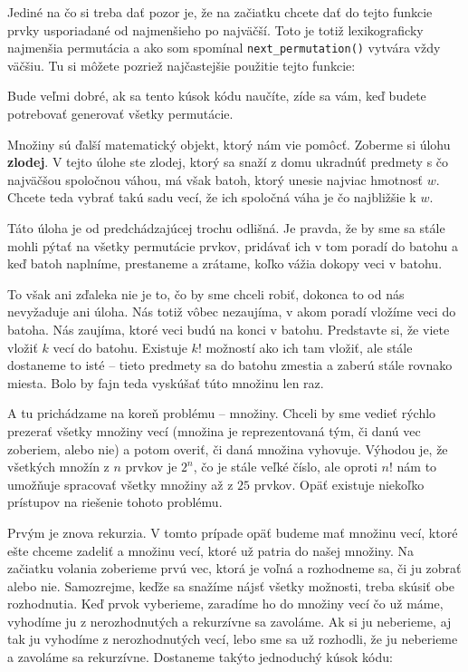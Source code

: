 Jediné na čo si treba dať pozor je, že na začiatku chcete dať do tejto funkcie prvky usporiadané od
najmenšieho po najväčší. Toto je totiž lexikograficky najmenšia permutácia a ako som spomínal
\texttt{next\_permutation()} vytvára vždy väčšiu. Tu si môžete pozriež najčastejšie použitie tejto
funkcie:


Bude veľmi dobré, ak sa tento kúsok kódu naučíte, zíde sa vám, keď budete potrebovať generovať všetky
permutácie.


Množiny sú ďalší matematický objekt, ktorý nám vie pomôcť. Zoberme si úlohu \textbf{zlodej}. V tejto
úlohe ste zlodej, ktorý sa snaží z domu ukradnúť predmety s čo najväčšou spoločnou váhou, má však
batoh, ktorý unesie najviac hmotnosť $w$. Chcete teda vybrať takú sadu vecí, že ich spoločná váha je
čo najbližšie k $w$.

Táto úloha je od predchádzajúcej trochu odlišná. Je pravda, že by sme sa stále mohli pýtať na všetky
permutácie prvkov, pridávať ich v tom poradí do batohu a keď batoh naplníme, prestaneme a zrátame,
koľko vážia dokopy veci v batohu.

To však ani zďaleka nie je to, čo by sme chceli robiť, dokonca to od nás nevyžaduje ani úloha. Nás
totiž vôbec nezaujíma, v akom poradí vložíme veci do batoha. Nás zaujíma, ktoré veci budú na konci v
batohu. Predstavte si, že viete vložiť $k$ vecí do batohu. Existuje $k!$ možností ako ich tam
vložiť, ale stále dostaneme to isté -- tieto predmety sa do batohu zmestia a zaberú stále rovnako
miesta. Bolo by fajn teda vyskúšať túto množinu len raz.

A tu prichádzame na koreň problému -- množiny. Chceli by sme vedieť rýchlo prezerať všetky množiny
vecí (množina je reprezentovaná tým, či danú vec zoberiem, alebo nie) a potom overiť, či daná
množina vyhovuje. Výhodou je, že všetkých množín z $n$ prvkov je $2^n$, čo je stále veľké číslo, ale
oproti $n!$ nám to umožňuje spracovať všetky množiny až z $25$ prvkov.
Opäť existuje niekoľko prístupov na riešenie tohoto problému.

Prvým je znova rekurzia. V tomto prípade opäť budeme mať množinu vecí, ktoré ešte chceme zadeliť a
množinu vecí, ktoré už patria do našej množiny. Na začiatku volania zoberieme prvú vec, ktorá je
voľná a rozhodneme sa, či ju zobrať alebo nie. Samozrejme, keďže sa snažíme nájsť všetky možnosti,
treba skúsiť obe rozhodnutia. Keď prvok vyberieme, zaradíme ho do množiny vecí čo už máme, vyhodíme
ju z nerozhodnutých a rekurzívne sa zavoláme. Ak si ju neberieme, aj tak ju vyhodíme z
nerozhodnutých vecí, lebo sme sa už rozhodli, že ju neberieme a zavoláme sa rekurzívne. Dostaneme
takýto jednoduchý kúsok kódu:

